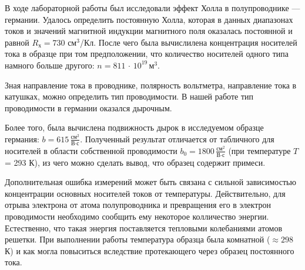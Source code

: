 \documentclass[a4paper]{article}
\theoremstyle{definition}
\theoremstyle{remark}
\begin{document}
    В ходе лабораторной работы был исследовали эффект Холла в полупроводнике --- германии. Удалось определить постоянную Холла, которая в данных диапазонах токов и значений магнитной индукции магнитного поля оказалась постоянной и равной $R_\text{х} = 730$ см$^3$/Кл. После чего была вычислилена концентрация носителей тока в образце при том предположении, что количество носителей одного типа намного больше другого: $n = 811\, \cdot \, 10^{19}\,\text{м}^3$. \medskip
    
    Зная направление тока в проводнике, полярность вольтметра, направление тока в катушках, можно определить тип проводимости. В нашей работе тип проводимости в германии оказался дырочным. \medskip
	
	Более того, была вычислена подвижность дырок в исследуемом образце германия: $b = 615\, \frac{\text{см}^2}{\text{В}\cdot\text{с}}$. Полученный результат отличается от табличного для носителей в области собственной проводимости $b_0 = 1800\, \frac{\text{см}^2}{\text{В}\cdot\text{с}}$ (при температуре $T$ = 293 К), из чего можно сделать вывод, что образец содержит примеси. \medskip
    
    Дополнительная ошибка измерений может быть связана с сильной зависимостью концентрации основных носителей токов от температуры. Действительно, для отрыва электрона от атома полупроводника и превращения его в электрон проводимости необходимо сообщить ему некоторое колличество энергии. Естественно, что такая энергия поставляется тепловыми колебаниями атомов решетки. При выполнении работы температура образца была комнатной ($\approx 298$ К) и как могла повыситься вследствие протекающего через образец постоянного тока.
	
\end{document}
